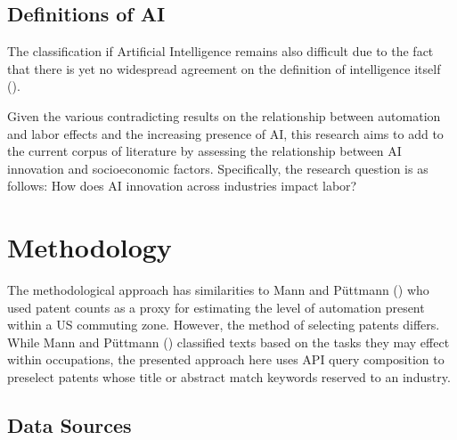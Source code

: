 \documentclass[
  11,
  a4paperpaper,
]{article}
\let\oldsection\section
\renewcommand\section{\clearpage\oldsection}
\begin{document}
\subsection{Definitions of AI}\label{definitions-of-ai}

The classification if Artificial Intelligence remains also difficult due
to the fact that there is yet no widespread agreement on the definition
of intelligence itself ().

Given the various contradicting results on the relationship between
automation and labor effects and the increasing presence of AI, this
research aims to add to the current corpus of literature by assessing
the relationship between AI innovation and socioeconomic factors.
Specifically, the research question is as follows: How does AI
innovation across industries impact labor?

\section{Methodology}\label{methodology}

The methodological approach has similarities to Mann and Püttmann
() who used patent counts as
a proxy for estimating the level of automation present within a US
commuting zone. However, the method of selecting patents differs. While
Mann and Püttmann () classified
texts based on the tasks they may effect within occupations, the
presented approach here uses API query composition to preselect patents
whose title or abstract match keywords reserved to an industry.

\subsection{Data Sources}\label{data-sources}
\end{document}

